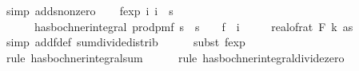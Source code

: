 \begin{isabellebody}
\ {\isacharparenleft}{\kern0pt}simp\ add{\isacharcolon}{\kern0pt}s{}{\isacharunderscore}{\kern0pt}nonzero{\isacharparenright}{\kern0pt}\isanewline
\isanewline
\ \ \isamarkupfalse%
\ f{}{\isacharunderscore}{\kern0pt}exp{\isacharcolon}{\kern0pt}\ {\isachardoublequoteopen}{\isasymAnd}i{\isachardot}{\kern0pt}\ i\ {\isacharless}{\kern0pt}\ s\ {\isasymLongrightarrow}\ \isanewline
\ \ \ \ \ \ has{\isacharunderscore}{\kern0pt}bochner{\isacharunderscore}{\kern0pt}integral\ {\isacharparenleft}{\kern0pt}prod{\isacharunderscore}{\kern0pt}pmf\ {\isacharparenleft}{\kern0pt}{\isacharbraceleft}{\kern0pt}{}{\isachardot}{\kern0pt}{\isachardot}{\kern0pt}{\isacharless}{\kern0pt}s\ {\isasymtimes}\ {\isacharbraceleft}{\kern0pt}{}{\isachardot}{\kern0pt}{\isachardot}{\kern0pt}{\isacharless}{\kern0pt}s\ {\isacharparenleft}{\kern0pt}{\isasymlambda}{\isacharunderscore}{\kern0pt}{\isachardot}{\kern0pt}\ {\isasymOmega}{\isacharparenright}{\kern0pt}{\isacharparenright}{\kern0pt}\ {\isacharparenleft}{\kern0pt}{\isasymlambda}{\isasymomega}{\isachardot}{\kern0pt}\ f{}\ {\isasymomega}\ i{\isacharparenright}{\kern0pt}\ \isanewline
\ \ \ \ {\isacharparenleft}{\kern0pt}real{\isacharunderscore}{\kern0pt}of{\isacharunderscore}{\kern0pt}rat\ {\isacharparenleft}{\kern0pt}F\ k\ as{\isacharparenright}{\kern0pt}{\isacharparenright}{\kern0pt}{\isachardoublequoteclose}\isanewline
\ \ \ \ \isamarkupfalse%
\ {\isacharparenleft}{\kern0pt}simp\ add{\isacharcolon}{\kern0pt}f{}{\isacharunderscore}{\kern0pt}def\ sum{\isacharunderscore}{\kern0pt}divide{\isacharunderscore}{\kern0pt}distrib{\isacharparenright}{\kern0pt}\isanewline
\ \ \ \ \isamarkupfalse%
\ {\isacharparenleft}{\kern0pt}subst\ f{}{\isacharunderscore}{\kern0pt}exp{\isacharunderscore}{\kern0pt}{}{\isacharparenright}{\kern0pt}\isanewline
\ \ \ \ \isamarkupfalse%
\ {\isacharparenleft}{\kern0pt}rule\ has{\isacharunderscore}{\kern0pt}bochner{\isacharunderscore}{\kern0pt}integral{\isacharunderscore}{\kern0pt}sum{\isacharparenright}{\kern0pt}\isanewline
\ \ \ \ \isamarkupfalse%
\ {\isacharparenleft}{\kern0pt}rule\ has{\isacharunderscore}{\kern0pt}bochner{\isacharunderscore}{\kern0pt}integral{\isacharunderscore}{\kern0pt}divide{\isacharunderscore}{\kern0pt}zero{\isacharparenright}{\kern0pt}\isanewline
\ \ \ \ \isamarkupfalse%

\end{isabellebody}
